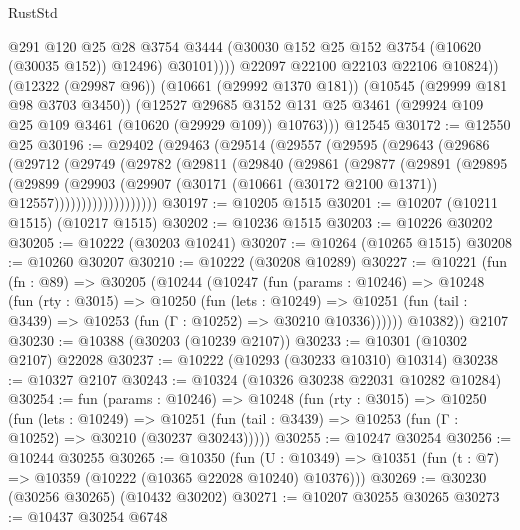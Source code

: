 \begin{lexlean}{RustStd}
\begin{coremodule}
                  @291
                  @120
                  @25
                  @28
                  @3754
                  @3444
                  (@30030 @152 @25 @152 @3754 (@10620 (@30035 @152)) @12496)
                  @30101))))
          @22097
          @22100
          @22103
          @22106
          @10824))
      (@12322 (@29987 @96))
      (@10661 (@29992 @1370 @181))
      (@10545 (@29999 @181 @98 @3703 @3450))
      (@12527
        @29685
        @3152
        @131
        @25
        @3461
        (@29924 @109 @25 @109 @3461 (@10620 (@29929 @109)) @10763)))
    @12545
@30172 := @12550 @25
@30196 := @29402
    (@29463
      (@29514
        (@29557
          (@29595
            (@29643
              (@29686
                (@29712
                  (@29749
                    (@29782
                      (@29811
                        (@29840
                          (@29861
                            (@29877
                              (@29891
                                (@29895
                                  (@29899
                                    (@29903
                                      (@29907
                                        (@30171
                                          (@10661 (@30172 @2100 @1371))
                                          @12557)))))))))))))))))))
@30197 := @10205 @1515
@30201 := @10207 (@10211 @1515) (@10217 @1515)
@30202 := @10236 @1515
@30203 := @10226 @30202
@30205 := @10222 (@30203 @10241)
@30207 := @10264 (@10265 @1515)
@30208 := @10260 @30207
@30210 := @10222 (@30208 @10289)
@30227 := @10221
    (fun (fn : @89) =>
    @30205
      (@10244
        (@10247
          (fun (params : @10246) =>
          @10248
            (fun (rty : @3015) =>
            @10250
              (fun (lets : @10249) =>
              @10251 (fun (tail : @3439) => @10253 (fun (Γ : @10252) => @30210 @10336))))))
        @10382))
    @2107
@30230 := @10388 (@30203 (@10239 @2107))
@30233 := @10301 (@10302 @2107) @22028
@30237 := @10222 (@10293 (@30233 @10310) @10314)
@30238 := @10327 @2107
@30243 := @10324 (@10326 @30238 @22031 @10282 @10284)
@30254 := fun (params : @10246) =>
  @10248
    (fun (rty : @3015) =>
    @10250
      (fun (lets : @10249) =>
      @10251 (fun (tail : @3439) => @10253 (fun (Γ : @10252) => @30210 (@30237 @30243)))))
@30255 := @10247 @30254
@30256 := @10244 @30255
@30265 := @10350
    (fun (U : @10349) => @10351 (fun (t : @7) => @10359 (@10222 (@10365 @22028 @10240) @10376)))
@30269 := @30230 (@30256 @30265) (@10432 @30202)
@30271 := @10207 @30255 @30265
@30273 := @10437 @30254 @6748

\end{coremodule}
\end{lexlean}
